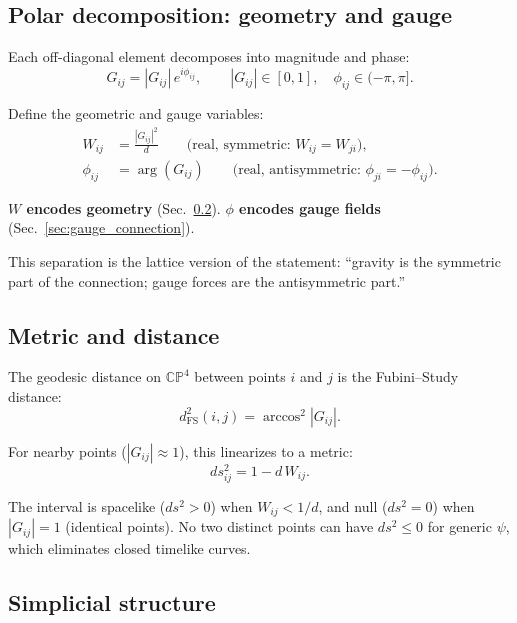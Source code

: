 \subsection{Polar decomposition: geometry and gauge}

Each off-diagonal element decomposes into magnitude and phase:
\begin{equation}
G_{ij} = |G_{ij}|\,e^{i\phi_{ij}}, \qquad |G_{ij}| \in [0, 1], \quad \phi_{ij} \in (-\pi, \pi].
\end{equation}

Define the geometric and gauge variables:
\begin{align}
W_{ij} &= \frac{|G_{ij}|^2}{d} \qquad\text{(real, symmetric: } W_{ij} = W_{ji}\text{)}, \label{eq:W}\\
\phi_{ij} &= \arg(G_{ij}) \qquad\text{(real, antisymmetric: } \phi_{ji} = -\phi_{ij}\text{)}. \label{eq:phi}
\end{align}

\textbf{$W$ encodes geometry} (Sec.~\ref{sec:metric}). \textbf{$\phi$ encodes gauge fields} (Sec.~\ref{sec:gauge_connection}).

This separation is the lattice version of the statement: ``gravity is the symmetric part of the connection; gauge forces are the antisymmetric part.''

\subsection{Metric and distance}
\label{sec:metric}

The geodesic distance on $\mathbb{CP}^4$ between points $i$ and $j$ is the Fubini--Study distance:
\begin{equation}
d^2_\text{FS}(i, j) = \arccos^2|G_{ij}|.
\end{equation}

For nearby points ($|G_{ij}| \approx 1$), this linearizes to a metric:
\begin{equation}
ds^2_{ij} = 1 - d\,W_{ij}.
\end{equation}

The interval is spacelike ($ds^2 > 0$) when $W_{ij} < 1/d$, and null ($ds^2 = 0$) when $|G_{ij}| = 1$ (identical points). No two distinct points can have $ds^2 \leq 0$ for generic $\psi$, which eliminates closed timelike curves.

\subsection{Simplicial structure}
\label{sec:simplex}

